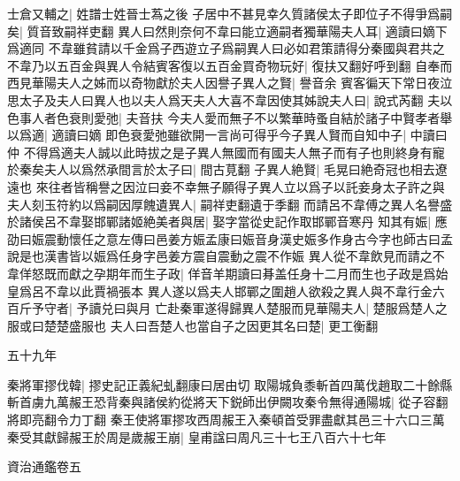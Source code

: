 士倉又輔之|{
	姓譜士姓晉士蒍之後}
子居中不甚見幸久質諸侯太子即位子不得爭爲嗣矣|{
	質音致嗣祥吏翻}
異人曰然則奈何不韋曰能立適嗣者獨華陽夫人耳|{
	適讀曰嫡下爲適同}
不韋雖貧請以千金爲子西遊立子爲嗣異人曰必如君策請得分秦國與君共之不韋乃以五百金與異人令結賓客復以五百金買奇物玩好|{
	復扶又翻好呼到翻}
自奉而西見華陽夫人之姊而以奇物獻於夫人因譽子異人之賢|{
	譽音余}
賓客徧天下常日夜泣思太子及夫人曰異人也以夫人爲天夫人大喜不韋因使其姊說夫人曰|{
	說式芮翻}
夫以色事人者色衰則愛弛|{
	夫音扶}
今夫人愛而無子不以繁華時蚤自結於諸子中賢孝者舉以爲適|{
	適讀曰嫡}
即色衰愛弛雖欲開一言尚可得乎今子異人賢而自知中子|{
	中讀曰仲}
不得爲適夫人誠以此時拔之是子異人無國而有國夫人無子而有子也則終身有寵於秦矣夫人以爲然承間言於太子曰|{
	間古莧翻}
子異人絶賢|{
	毛晃曰絶奇冠也相去遼遠也}
來往者皆稱譽之因泣曰妾不幸無子願得子異人立以爲子以託妾身太子許之與夫人刻玉符約以爲嗣因厚餽遺異人|{
	嗣祥吏翻遺于季翻}
而請呂不韋傅之異人名譽盛於諸侯呂不韋娶邯鄲諸姬絶美者與居|{
	娶字當從史記作取邯鄲音寒丹}
知其有娠|{
	應劭曰娠震動懷任之意左傳曰邑姜方娠孟康曰娠音身漢史娠多作身古今字也師古曰孟說是也漢書皆以娠爲任身字邑姜方震自震動之震不作娠}
異人從不韋飲見而請之不韋佯怒既而獻之孕期年而生子政|{
	佯音羊期讀曰朞盖任身十二月而生也子政是爲始皇爲呂不韋以此賈禍張本}
異人遂以爲夫人邯鄲之圍趙人欲殺之異人與不韋行金六百斤予守者|{
	予讀兑曰與月}
亡赴秦軍遂得歸異人楚服而見華陽夫人|{
	楚服爲楚人之服或曰楚楚盛服也}
夫人曰吾楚人也當自子之因更其名曰楚|{
	更工衡翻}


五十九年

秦將軍摎伐韓|{
	摎史記正義紀虬翻康曰居由切}
取陽城負黍斬首四萬伐趙取二十餘縣斬首虜九萬赧王恐背秦與諸侯約從將天下鋭師出伊闕攻秦令無得通陽城|{
	從子容翻將即亮翻令力丁翻}
秦王使將軍摎攻西周赧王入秦頓首受罪盡獻其邑三十六口三萬秦受其獻歸赧王於周是歲赧王崩|{
	皇甫諡曰周凡三十七王八百六十七年}


資治通鑑卷五
